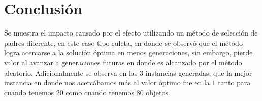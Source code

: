 \documentclass{article}
\begin{document}
\section{Conclusi\'{o}n}\label{con}

Se muestra el impacto causado por el efecto utilizando un m\'etodo de selecci\'on de padres diferente, en este caso tipo ruleta, en donde se observ\'o que el m\'etodo logra acercarse a la soluci\'on \'optima en menos generaciones, sin embargo, pierde valor al avanzar a generaciones futuras en donde es alcanzado por el m\'etodo aleatorio. Adicionalmente se observa en las $3$ instancias generadas, que la mejor instancia en donde nos acerc\'abamos m\'as al valor \'optimo fue en la $1$ tanto para cuando tenemos $20$ como cuando tenemos $80$ objetos.

  
  
\end{document}
